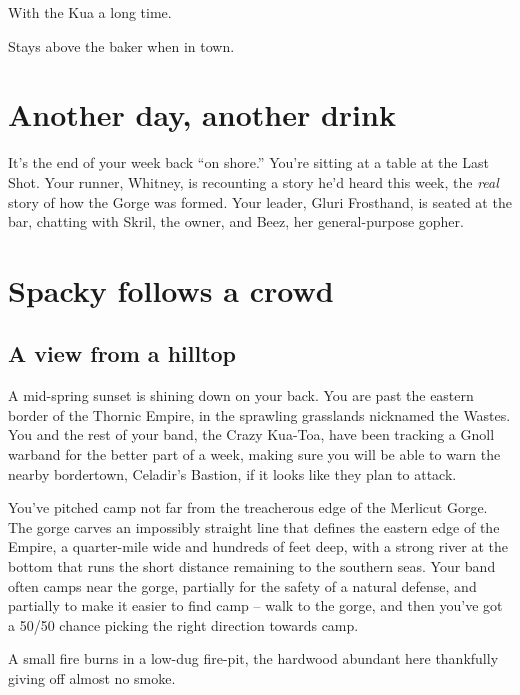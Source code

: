With the Kua a long time.

Stays above the baker when in town.




\section{Another day, another drink}
\begin{multicols}{2}
  \begin{aloud}
    It's the end of your week back ``on shore.''
    You're sitting at a table at the Last Shot.
    Your runner, Whitney, is recounting a story he'd heard this week, the \emph{real} story of how the Gorge was formed.
    Your leader, Gluri Frosthand, is seated at the bar, chatting with Skril, the owner, and Beez,
      her general-purpose gopher.
  \end{aloud}


\section{Spacky follows a crowd}
\subsection{A view from a hilltop}
  \begin{aloud}
  A mid-spring sunset is shining down on your back.
  You are past the eastern border of the Thornic Empire, in the sprawling grasslands
    nicknamed the Wastes.
  You and the rest of your band, the Crazy Kua-Toa, have been tracking a Gnoll warband for the
    better part of a week, making sure you will be able to warn the nearby bordertown,
    Celadir's Bastion, if it looks like they plan to attack.
  \end{aloud}

You've pitched camp not far from the treacherous edge of the Merlicut Gorge.
The gorge carves an impossibly straight line that defines the eastern edge of the Empire,
  a quarter-mile wide and hundreds of feet deep, with a strong river at the bottom that runs
  the short distance remaining to the southern seas.
Your band often camps near the gorge, partially for the safety of a natural defense, and partially
  to make it easier to find camp -- walk to the gorge, and then you've got a 50/50 chance
  picking the right direction towards camp.

A small fire burns in a low-dug fire-pit, the hardwood abundant here thankfully giving off
  almost no smoke.


\end{multicols}
